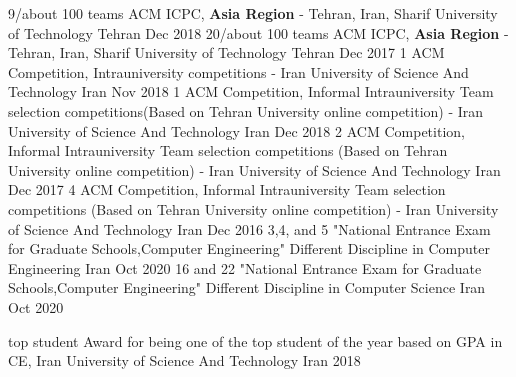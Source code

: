 


\begin{cvhonors}

  \cvhonor
    {9/about 100 teams} %
    {ACM ICPC,\textbf{ Asia Region} - Tehran, Iran, Sharif University of Technology} %
    {Tehran} %
    {Dec 2018} %
  \cvhonor
    {20/about 100 teams} %
    {ACM ICPC, \textbf{Asia Region} - Tehran, Iran, Sharif University of Technology} %
    {Tehran} %
    {Dec 2017} %
  \cvhonor
    {1} %
    {ACM Competition, Intra\-university competitions - Iran University of Science And Technology} %
    {Iran} %
    {Nov 2018} %
  \cvhonor
    {1} %
    {ACM Competition, Informal Intra\-university Team selection competitions(Based on Tehran University online competition) - Iran University of Science And Technology} %
    {Iran} %
    {Dec 2018} %
  \cvhonor
    {2} %
    {ACM Competition, Informal Intra\-university Team selection competitions (Based on Tehran University online competition) - Iran University of Science And Technology} %
    {Iran} %
    {Dec 2017} %
  \cvhonor
    {4} %
    {ACM Competition, Informal Intra\-university Team selection competitions (Based on Tehran University online competition) - Iran University of Science And Technology} %
    {Iran} %
    {Dec 2016} %
  \cvhonor
    {3,4, and 5} %
    {"National Entrance Exam for Graduate Schools,Computer Engineering" Different Discipline in Computer Engineering} %
    {Iran} %
    {Oct 2020} %
  \cvhonor
    {16 and 22} %
    {"National Entrance Exam for Graduate Schools,Computer Engineering" Different Discipline in Computer Science} %
    {Iran} %
    {Oct 2020} %
    
  \cvhonor
    {top student} %
    {Award for being one of the top student of the year based on GPA in CE, Iran University of Science And Technology} %
    {Iran} %
    {2018} %
    

\end{cvhonors}
